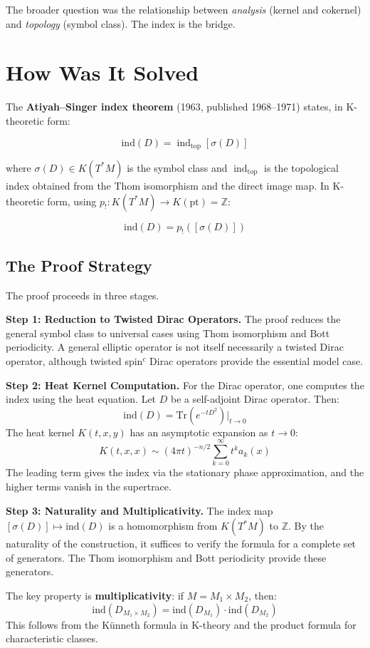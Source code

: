 The broader question was the relationship between \emph{analysis} (kernel and
cokernel) and \emph{topology} (symbol class). The index is the bridge.

\section{How Was It Solved}

The \textbf{Atiyah--Singer index theorem} (1963, published 1968--1971) states, in K-theoretic form:

\[\text{ind}(D)=\operatorname{ind}_{\mathrm{top}}[\sigma(D)]\]

where $\sigma(D)\in K(T^*M)$ is the symbol class and
$\operatorname{ind}_{\mathrm{top}}$ is the topological index obtained from
the Thom isomorphism and the direct image map. In K-theoretic form, using
$p_!:K(T^*M)\to K(\mathrm{pt})=\mathbb{Z}$:

\[\text{ind}(D) = p_!([\sigma(D)])\]

\subsection*{The Proof Strategy}

The proof proceeds in three stages.

\textbf{Step 1: Reduction to Twisted Dirac Operators.}
The proof reduces the general symbol class to universal cases using Thom
isomorphism and Bott periodicity. A general elliptic operator is not itself
necessarily a twisted Dirac operator, although twisted spin$^c$ Dirac
operators provide the essential model case.

\textbf{Step 2: Heat Kernel Computation.}
For the Dirac operator, one computes the index using the heat equation.
Let $D$ be a self-adjoint Dirac operator. Then:
\[\text{ind}(D) = \text{Tr}(e^{-tD^2})|_{t \to 0}\]
The heat kernel $K(t, x, y)$ has an asymptotic expansion as $t \to 0$:
\[K(t, x, x) \sim (4\pi t)^{-n/2} \sum_{k=0}^\infty t^k a_k(x)\]
The leading term gives the index via the stationary phase approximation, and
the higher terms vanish in the supertrace.

\textbf{Step 3: Naturality and Multiplicativity.}
The index map $[\sigma(D)] \mapsto \text{ind}(D)$ is a homomorphism from
$K(T^*M)$ to $\mathbb{Z}$. By the naturality of the construction, it suffices
to verify the formula for a complete set of generators. The Thom isomorphism
and Bott periodicity provide these generators.

The key property is \textbf{multiplicativity}: if $M = M_1 \times M_2$, then:
\[\text{ind}(D_{M_1 \times M_2}) = \text{ind}(D_{M_1}) \cdot \text{ind}(D_{M_2})\]
This follows from the Künneth formula in K-theory and the product formula
for characteristic classes.

